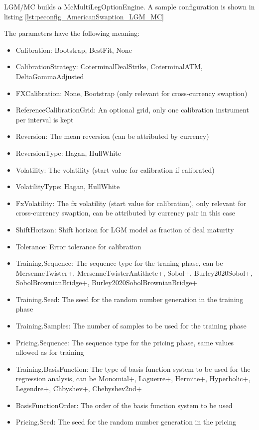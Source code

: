 LGM/MC builds a McMultiLegOptionEngine. A sample configuration is shown in
listing \ref{lst:peconfig_AmericanSwaption_LGM_MC}

The parameters have the following meaning:

\begin{itemize}
\item Calibration: Bootstrap, BestFit, None
\item CalibrationStrategy: CoterminalDealStrike, CoterminalATM, DeltaGammaAdjusted
\item FXCalibration: None, Bootstrap (only relevant for cross-currency swaption)
\item ReferenceCalibrationGrid: An optional grid, only one calibration instrument per interval is kept
\item Reversion: The mean reversion (can be attributed by currency)
\item ReversionType: Hagan, HullWhite
\item Volatility: The volatility (start value for calibration if calibrated)
\item VolatilityType: Hagan, HullWhite
\item FxVolatility: The fx volatility (start value for calibration), only relevant for cross-currency swaption, can be
  attributed by currency pair in this case
\item ShiftHorizon: Shift horizon for LGM model as fraction of deal maturity
\item Tolerance: Error tolerance for calibration
\item Training.Sequence: The sequence type for the traning phase, can be MersenneTwister+, MersenneTwisterAntithetc+,
  Sobol+, Burley2020Sobol+, SobolBrownianBridge+, Burley2020SobolBrownianBridge+
\item Training.Seed: The seed for the random number generation in the training phase
\item Training.Samples: The number of samples to be used for the training phase
\item Pricing.Sequence: The sequence type for the pricing phase, same values allowed as for training
\item Training.BasisFunction: The type of basis function system to be used for the regression analysis, can be
  Monomial+, Laguerre+, Hermite+, Hyperbolic+, Legendre+, Chbyshev+, Chebyshev2nd+
\item BasisFunctionOrder: The order of the basis function system to be used
\item Pricing.Seed: The seed for the random number generation in the pricing

\end{itemize}
